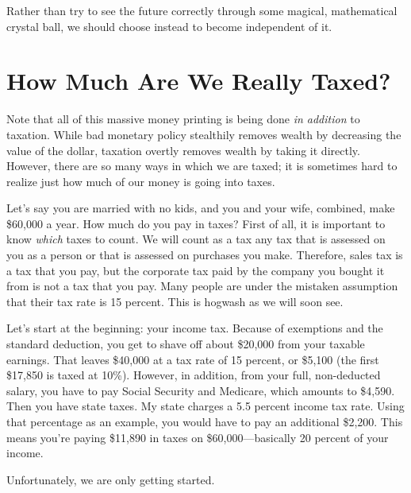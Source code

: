 \documentclass[letterpaper]{article}
\begin{document}
{\color{black}
Rather than try to see the future correctly through some magical,
mathematical crystal ball, we should choose instead to become
independent of it.}

\section{How Much Are We Really Taxed?}
{\color{black}
Note that all of this massive money printing is being done \textit{in
addition }to taxation. While bad monetary policy stealthily removes
wealth by decreasing the value of the dollar, taxation overtly removes
wealth by taking it directly. However, there are so many ways in which
we are taxed; it is sometimes hard to realize just how much of our
money is going into taxes.}

{\color{black}
Let’s say you are married with no kids, and you and your wife, combined,
make \$60,000 a year. How much do you pay in taxes?  First of all, it
is important to know \textit{which} taxes to count. We will count as a
tax any tax that is assessed on you as a person or that is assessed on
purchases you make. Therefore, sales tax is a tax that you pay, but the
corporate tax paid by the company you bought it from is not a tax that
you pay. Many people are under the mistaken assumption that their tax
rate is 15 percent. This is hogwash as we will soon see.}

{\color{black}
Let’s start at the beginning: your income tax. Because of exemptions and
the standard deduction, you get to shave off about \$20,000 from your
taxable \textcolor[rgb]{0.32941177,0.5529412,0.83137256}{earnings}.
That leaves \$40,000 at a tax rate of 15 percent, or \$5,100 (the first
\$17,850 is taxed at 10\%). However, in addition, from your full,
non-deducted salary, you have to pay Social Security and Medicare,
which amounts to \$4,590. Then you have state taxes. My state charges a
5.5 percent income tax
rate\textcolor[rgb]{0.32941177,0.5529412,0.83137256}{. Using that
percentage as an example, }you would have to pay an additional \$2,200.
\textcolor[rgb]{0.32941177,0.5529412,0.83137256}{This means you’re
}paying \$11,890 in taxes on \$60,000—basically 20 percent of
\textcolor[rgb]{0.32941177,0.5529412,0.83137256}{your} income. }

{\color{black}
\textcolor[rgb]{0.32941177,0.5529412,0.83137256}{U}nfortunately, we are
only getting started.}
\end{document}

